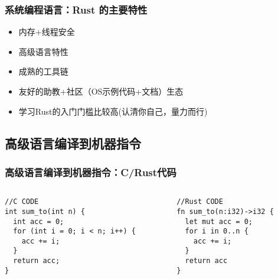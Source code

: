\begin{frame}
	\frametitle{系统编程语言：\small{Rust 的主要特性}}
	
		
		\begin{itemize}
			\item 内存+线程安全
			\item 高级语言特性
			\item 成熟的工具链
			\item 友好的助教+社区（OS示例代码+文档）生态
			\item 学习Rust的入门门槛比较高(认清你自己，量力而行)
		\end{itemize}
		
	
\end{frame}


\subsection{高级语言编译到机器指令} %



\begin{frame}[fragile]
	\frametitle{高级语言编译到机器指令：\small{C/Rust代码}}

	\begin{columns}[t]
	\begin{column}{.45\linewidth}
		
\begin{block}{}
\begin{verbatim}
//C CODE
int sum_to(int n) {
  int acc = 0;
  for (int i = 0; i < n; i++) {
    acc += i;
  }
  return acc;
}
\end{verbatim}
\end{block}
\end{column}

\begin{column}{.45\linewidth}
\begin{block}{}
\begin{verbatim}
//Rust CODE
fn sum_to(n:i32)->i32 {
  let mut acc = 0;
  for i in 0..n {
    acc += i;
  }
  return acc
}
\end{verbatim}
\end{block}
\end{column}
\end{columns}
	
\end{frame}





